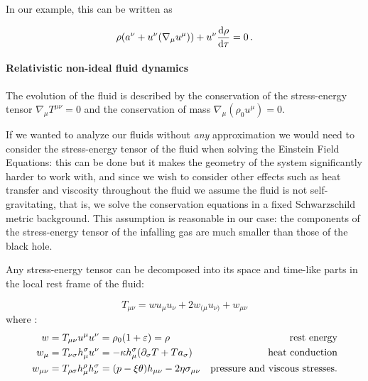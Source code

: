 \documentclass[main.tex]{subfiles}
\begin{document}
In our example, this can be written as

\begin{equation}
  \rho (a^\nu + u^\nu (\nabla_\mu u^\mu)) + u^\nu \dv{\rho}{\tau} = 0\,.
\end{equation}

\paragraph{Relativistic non-ideal fluid dynamics}

The evolution of the fluid is described by the conservation of the stress-energy tensor \(\nabla_\mu T ^{\mu \nu} =0\) and the conservation of mass \(\nabla_\mu (\rho_0 u^\mu) =0\).

If we wanted to analyze our fluids without \emph{any} approximation we would need to consider the stress-energy tensor of the fluid when solving the Einstein Field Equations: this can be done but it makes the geometry of the system significantly harder to work with, and since we wish to consider other effects such as heat transfer and viscosity throughout the fluid we assume the fluid is not self-gravitating, that is, we solve the conservation equations in a fixed Schwarzschild metric background.
This assumption is reasonable in our case: the components of the stress-energy tensor of the infalling gas are much smaller than those of the black hole.

Any stress-energy tensor can be decomposed into its space and time-like parts in the local rest frame of the fluid:

\begin{equation} \label{eq:stress-energy-tensor-decomposition}
    T_{\mu \nu} = w u_\mu u_\nu + 2 w_{(\mu} u_{\nu)} + w _{\mu \nu}
\end{equation}
where \cite[eqs. 8.2, 8.3, 8.5]{Taub:1948}:
\begin{subequations} \label{eq:components-stress-energy-tensor}
\begin{align}
  w &=  T _{\mu \nu} u^\mu u^\nu = \rho_0 (1 + \varepsilon) = \rho & \text{rest energy} \\
  w_\mu &= T _{\nu \sigma} h^\sigma _\mu u^\nu  = -\kappa h_\mu ^\sigma  \qty(\partial_\sigma T + T a_\sigma) & \text{heat conduction} \\
  w_{\mu \nu} &= T_{\rho \sigma} h^\rho _\mu h^\sigma_\nu = \qty(p - \xi \theta) h_{\mu \nu} - 2 \eta \sigma_{\mu \nu}  & \text{pressure and viscous stresses.}
\end{align}
\end{subequations}
\end{document}
